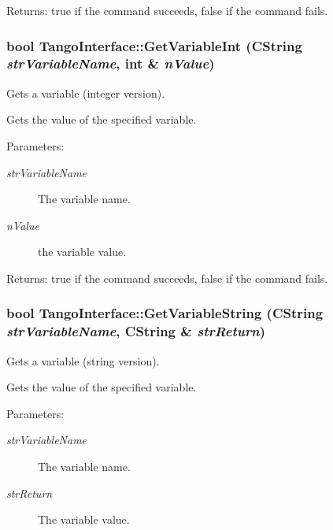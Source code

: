 \begin{Desc}
\item[Returns:]true if the command succeeds, false if the command fails. \end{Desc}
\hypertarget{classTangoInterface_ea841d48dfb2d66019268beda8ba2da5}{
\subsubsection[GetVariableInt]{\setlength{\rightskip}{0pt plus 5cm}bool TangoInterface::GetVariableInt (CString {\em strVariableName}, \/  int \& {\em nValue})}}
\label{classTangoInterface_ea841d48dfb2d66019268beda8ba2da5}


Gets a variable (integer version). 

Gets the value of the specified variable.

\begin{Desc}
\item[Parameters:]
\begin{description}
\item[{\em strVariableName}]The variable name. \item[{\em nValue}]the variable value. \end{description}
\end{Desc}


\begin{Desc}
\item[Returns:]true if the command succeeds, false if the command fails. \end{Desc}
\hypertarget{classTangoInterface_90bceaea83a14b34d3a6c4dca7f5756b}{
\subsubsection[GetVariableString]{\setlength{\rightskip}{0pt plus 5cm}bool TangoInterface::GetVariableString (CString {\em strVariableName}, \/  CString \& {\em strReturn})}}
\label{classTangoInterface_90bceaea83a14b34d3a6c4dca7f5756b}


Gets a variable (string version). 

Gets the value of the specified variable.

\begin{Desc}
\item[Parameters:]
\begin{description}
\item[{\em strVariableName}]The variable name. \item[{\em strReturn}]The variable value. \end{description}
\end{Desc}


